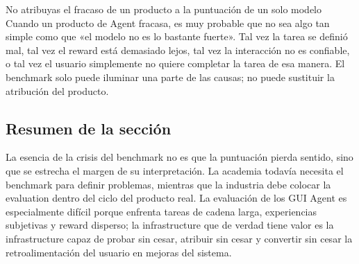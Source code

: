 \begin{warningbox}{No atribuyas el fracaso de un producto a la puntuación de un solo modelo}
Cuando un producto de Agent fracasa, es muy probable que no sea algo tan simple como que «el modelo no es lo bastante fuerte». Tal vez la tarea se definió mal, tal vez el reward está demasiado lejos, tal vez la interacción no es confiable, o tal vez el usuario simplemente no quiere completar la tarea de esa manera. El benchmark solo puede iluminar una parte de las causas; no puede sustituir la atribución del producto.
\end{warningbox}

\subsection{Resumen de la sección}

La esencia de la crisis del benchmark no es que la puntuación pierda sentido, sino que se estrecha el margen de su interpretación. La academia todavía necesita el benchmark para definir problemas, mientras que la industria debe colocar la evaluation dentro del ciclo del producto real. La evaluación de los GUI Agent es especialmente difícil porque enfrenta tareas de cadena larga, experiencias subjetivas y reward disperso; la infrastructure que de verdad tiene valor es la infrastructure capaz de probar sin cesar, atribuir sin cesar y convertir sin cesar la retroalimentación del usuario en mejoras del sistema.

